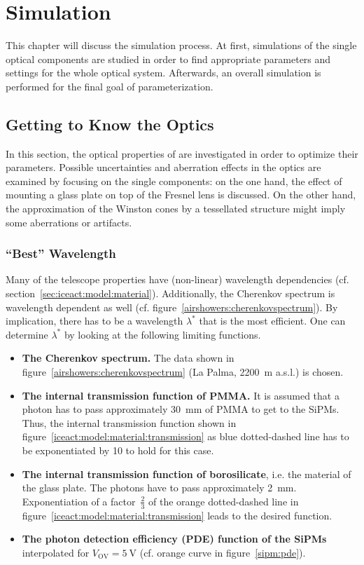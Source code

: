 \chapter{\iceact Simulation}\label{chap:iceact_sim}

This chapter will discuss the \geant simulation process. At first, simulations of the single optical components are studied in order to find appropriate parameters and settings for the whole optical system. Afterwards, an overall simulation is performed for the final goal of \iceact parameterization.

\section{Getting to Know the \iceact Optics}

In this section, the optical properties of \iceact are investigated in order to optimize their parameters. Possible uncertainties and aberration effects in the \iceact optics are examined by focusing on the single components: on the one hand, the effect of mounting a glass plate on top of the Fresnel lens is discussed. On the other hand, the approximation of the Winston cones by a tessellated structure might imply some aberrations or artifacts. 

\subsection{\enquote{Best} Wavelength}\label{sec:best_wvl}

Many of the \iceact telescope properties have (non-linear) wavelength dependencies (cf. section~\ref{sec:iceact:model:material}). Additionally, the Cherenkov spectrum is wavelength dependent as well (cf. figure~\ref{airshowers:cherenkovspectrum}). By implication, there has to be a wavelength $\lambda^\ast$ that \iceact is the most efficient. One can determine $\lambda^\ast$ by looking at the following limiting functions.

\begin{itemize}
	\item \textbf{The Cherenkov spectrum.} The data shown in figure~\ref{airshowers:cherenkovspectrum} (La Palma, \SI{2200}{\meter} a.s.l.) is chosen.
	\item \textbf{The internal transmission function of PMMA.} It is assumed that a photon has to pass approximately \SI{30}{\milli\meter} of PMMA to get to the SiPMs. Thus, the internal transmission function shown in figure~\ref{iceact:model:material:transmission} as blue dotted-dashed line has to be exponentiated by \num{10} to hold for this case.
	\item \textbf{The internal transmission function of borosilicate}, i.e. the material of the glass plate. The photons have to pass approximately \SI{2}{\milli\meter}. Exponentiation of a factor~$\frac{2}{3}$ of the orange dotted-dashed line in figure~\ref{iceact:model:material:transmission} leads to the desired function.
	\item \textbf{The photon detection efficiency (PDE) function of the SiPMs} interpolated for $V_\text{OV} = \SI{5}{\volt}$ (cf. orange curve in figure~\ref{sipm:pde}).
\end{itemize}

